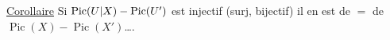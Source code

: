 \uline{Corollaire} Si $\operatorname{Pic}(U|X)\mathbin{-}\operatorname{Pic}(U')$ est injectif (surj, bijectif) il en est de $=$ de $\operatorname{Pic}(X)\mathbin{-}\operatorname{Pic}(X')$\ldots.
